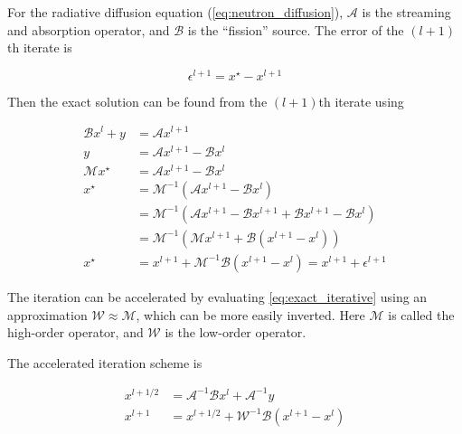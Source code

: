 \documentclass{template}
\begin{document}
For the radiative diffusion equation (\autoref{eq:neutron_diffusion}), $\mathcal{A}$ is the streaming and absorption operator, and $\mathcal{B}$ is the ``fission'' source. The error of the $(l+1)$th iterate is

\begin{equation}
  \epsilon^{l+1} = x^\star - x^{l+1}
\end{equation}

Then the exact solution can be found from the $(l+1)$th iterate using

\begin{subequations}
  \begin{align}
  \mathcal{B}x^l + y &= \mathcal{A}x^{l+1}\\
  y & = \mathcal{A}x^{l+1} - \mathcal{B}x^l\\
  \mathcal{M}x^\star &= \mathcal{A}x^{l+1} - \mathcal{B}x^l\\
  x^\star &= \mathcal{M}^{-1} \left(\mathcal{A}x^{l+1} - \mathcal{B}x^l \right)\\
          &= \mathcal{M}^{-1} \left(\mathcal{A}x^{l+1} - \mathcal{B}x^{l+1}+\mathcal{B}x^{l+1}- \mathcal{B}x^l \right)\\
          &= \mathcal{M}^{-1} \left(\mathcal{M}x^{l+1} +\mathcal{B}{\left( x^{l+1}- x^l \right) }\right)\\
          \label{eq:exact_iterative}x^\star &=  x^{l+1} + \mathcal{M}^{-1}\mathcal{B}{\left( x^{l+1}- x^l \right)} = x^{l+1} + \epsilon^{l+1}
  \end{align}
\end{subequations}

The iteration can be accelerated by evaluating \autoref{eq:exact_iterative} using an approximation $\mathcal{W} \approx \mathcal{M}$, which can be more easily inverted. Here $\mathcal{M}$ is called the high-order operator, and $\mathcal{W}$ is the low-order operator.

The accelerated iteration scheme is

\begin{align}
  x^{l+1/2} &=  \mathcal{A}^{-1} \mathcal{B}x^l + \mathcal{A}^{-1}y\\
  x^{l+1}   &=  x^{l+1/2} + \mathcal{W}^{-1}\mathcal{B}{\left( x^{l+1}- x^l \right)}
\end{align}




\cite{fleck1971implicit}



\end{document}
